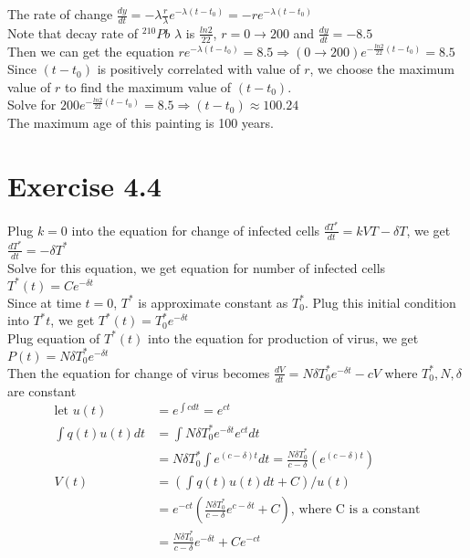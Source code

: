 \documentclass[11pt,letterpaper]{article}
\begin{document}
\noindent The rate of change $\frac{dy}{dt} = -\lambda  \frac{r}{\lambda} e^{-\lambda (t - t_0)} = - r e^{-\lambda (t - t_0)}$ \\

\noindent Note that decay rate of $^{210}Pb$ $\lambda$ is $\frac{ln2}{22}$, $r = 0 \to 200$ and $\frac{dy}{dt} = - 8.5$\\

\noindent Then we can get the equation $r e^{ -\lambda (t - t_0)} = 8.5 \Rightarrow (0 \to 200) e^{- \frac{ln2}{22} (t - t_0)}  =  8.5$ \\

\noindent Since $(t - t_0)$ is positively correlated with value of $r$, we choose the maximum value of $r$ to find the maximum value of $(t - t_0)$.\\

\noindent Solve for $200 e ^{-\frac{ln2}{22} (t - t_0)} = 8.5 \Rightarrow (t - t_0) \approx 100.24$ \\

\noindent The maximum age of this painting is 100 years. 

\newpage

\section*{Exercise 4.4}
\noindent Plug $k = 0$ into the equation for change of infected cells $\frac{dT^{*}}{dt} = kVT - \delta T$, we get $\frac{dT^{*}}{dt} = -\delta T^{*}$ \\

\noindent Solve for this equation, we get equation for number of infected cells $T^{*}(t) = C e^{-\delta t}$ \\

\noindent Since at time $t=0$, $T^*$ is approximate constant as $T^*_0$. Plug this initial condition into $T^*{t}$, we get $T^*(t) = T^*_0 e^{-\delta t}$ \\

\noindent Plug equation of $T^{*}(t)$ into the equation for production of virus, we get $P(t) = N \delta T^{*}_0 e^{-\delta t}$ \\

\noindent Then the equation for change of virus becomes $\frac{dV}{dt} =N \delta T^{*}_0 e^{-\delta t} - cV $ where $T^*_0, N, \delta$ are constant
\begin{align*}
\text{let } u(t) & = e^{\int c dt} = e^{ct} \\
\int q(t) u(t) dt & = \int N \delta T_0^* e^{-\delta t} e^{ct} dt \\
& =  N \delta T_0^* \int e^{(c - \delta )t} dt = \frac{ N \delta T_0^*}{c - \delta} (e^{(c - \delta)t}) \\
V(t) & = (\int q(t) u(t) dt + C) / u(t) \\
& = e^{-ct}( \frac{ N \delta T_0^*}{c - \delta} e^{c - \delta t} + C) \text{, where C is a constant} \\
& = \frac{N \delta T_0^*}{c - \delta} e^{-\delta t} + C e^{-ct}
\end{align*}
\end{document}
